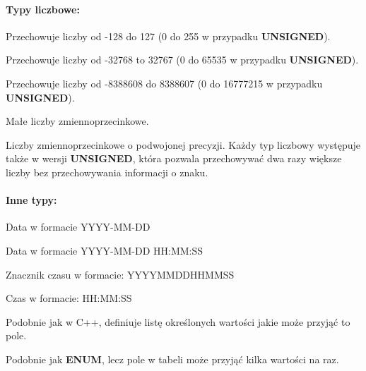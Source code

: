 \documentclass[a4paper,10pt]{article}
\renewenvironment{description}[1][0pt]
	{\list{}{\labelwidth=0pt \leftmargin=#1
	\let\makelabel\descriptionlabel}}
	{\endlist}
\begin{document}
\paragraph{Typy liczbowe:}
\begin{description}[5mm]
\item[TINYINY] Przechowuje liczby od -128 do 127 (0 do 255 w przypadku \textbf{UNSIGNED}).
\item[SMALLINT] Przechowuje liczby od -32768 to 32767 (0 do 65535 w przypadku \textbf{UNSIGNED}).
\item[MEDIUMINT] Przechowuje liczby od -8388608 do 8388607 (0 do 16777215 w przypadku \textbf{UNSIGNED}).
\item[FLOAT] Małe liczby zmiennoprzecinkowe.
\item[DOUBLE] Liczby zmiennoprzecinkowe o podwojonej precyzji.
\end{description}
Każdy typ liczbowy występuje także w wersji \textbf{UNSIGNED}, która pozwala przechowywać dwa razy większe liczby bez przechowywania informacji o znaku.
\paragraph{Inne typy:}
\begin{description}[5mm]
\item[DATE] Data w formacie YYYY-MM-DD
\item[DATETIME] Data w formacie YYYY-MM-DD HH:MM:SS
\item[TIMESTAMP] Znacznik czasu w formacie: YYYYMMDDHHMMSS
\item[TIME] Czas w formacie: HH:MM:SS
\item[ENUM] Podobnie jak w C++, definiuje listę określonych wartości jakie może przyjąć to pole.
\item[SET] Podobnie jak \textbf{ENUM}, lecz pole w tabeli może przyjąć kilka wartości na raz.
\end{description}
\end{document}
